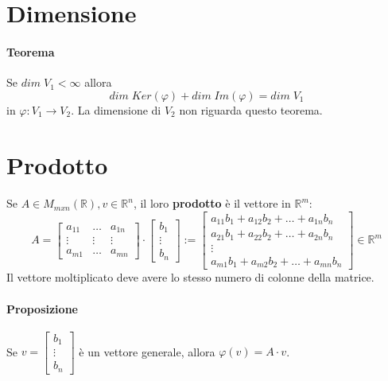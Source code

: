 \documentclass[a4paper, 12pt]{report}
\begin{document}
        \section{Dimensione}
            \paragraph{Teorema} Se $dim \; V_1<\infty$ allora
            $$dim \; Ker(\varphi)+dim \; Im(\varphi)=dim \; V_1$$
            in $\varphi:V_1\rightarrow V_2$. La dimensione di $V_2$ non riguarda questo teorema.
        \section{Prodotto}
            \paragraph{}Se $A \in M_{mxn}(\mathbb{R}), v \in \mathbb{R}^n$, il loro \textbf{prodotto} è il vettore in $\mathbb{R}^m$:
            $$
            A=
            \begin{bmatrix}
                a_{11} & \dots & a_{1n}\\
                \vdots & \vdots & \vdots\\
                a_{m1} & \dots & a_{mn}
            \end{bmatrix}
            \cdot 
            \begin{bmatrix}
                b_1\\
                \vdots\\
                b_n
            \end{bmatrix}
            :=
            \begin{bmatrix}
                a_{11}b_1+a_{12}b_2+\dots+a_{1n}b_n\\
                a_{21}b_1+a_{22}b_2+\dots+a_{2n}b_n\\
                \vdots\\
                a_{m1}b_1+a_{m2}b_2+\dots+a_{mn}b_n
            \end{bmatrix}
            \in \mathbb{R}^m
            $$
            Il vettore moltiplicato deve avere lo stesso numero di colonne della matrice.
            \paragraph{Proposizione} Se $v=
            \begin{bmatrix}
                b_1\\
                \vdots\\
                b_n
            \end{bmatrix}
            $
            è un vettore generale, allora $\varphi(v)=A\cdot v$.
\end{document}
